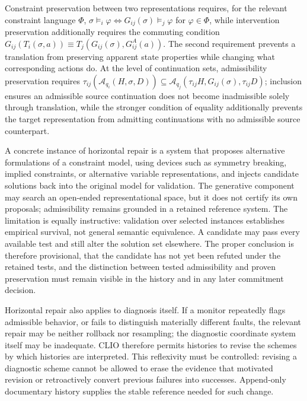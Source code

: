 Constraint preservation between two representations requires, for the relevant constraint language $\Phi$, $\sigma \models_i \varphi \iff G_{ij}(\sigma) \models_j \varphi$ for $\varphi \in \Phi$, while intervention preservation additionally requires the commuting condition $G_{ij}(T_i(\sigma,a)) \equiv T_j(G_{ij}(\sigma), G^A_{ij}(a))$. The second requirement prevents a translation from preserving apparent state properties while changing what corresponding actions do. At the level of continuation sets, admissibility preservation requires $\tau_{ij}(\mathcal{A}_{q_i}(H,\sigma,D)) \subseteq \mathcal{A}_{q_j}(\tau_{ij}H, G_{ij}(\sigma), \tau_{ij}D)$; inclusion ensures an admissible source continuation does not become inadmissible solely through translation, while the stronger condition of equality additionally prevents the target representation from admitting continuations with no admissible source counterpart.

A concrete instance of horizontal repair is a system that proposes alternative formulations of a constraint model, using devices such as symmetry breaking, implied constraints, or alternative variable representations, and injects candidate solutions back into the original model for validation. The generative component may search an open-ended representational space, but it does not certify its own proposals; admissibility remains grounded in a retained reference system. The limitation is equally instructive: validation over selected instances establishes empirical survival, not general semantic equivalence. A candidate may pass every available test and still alter the solution set elsewhere. The proper conclusion is therefore provisional, that the candidate has not yet been refuted under the retained tests, and the distinction between tested admissibility and proven preservation must remain visible in the history and in any later commitment decision.

Horizontal repair also applies to diagnosis itself. If a monitor repeatedly flags admissible behavior, or fails to distinguish materially different faults, the relevant repair may be neither rollback nor resampling; the diagnostic coordinate system itself may be inadequate. CLIO therefore permits histories to revise the schemes by which histories are interpreted. This reflexivity must be controlled: revising a diagnostic scheme cannot be allowed to erase the evidence that motivated revision or retroactively convert previous failures into successes. Append-only documentary history supplies the stable reference needed for such change.

